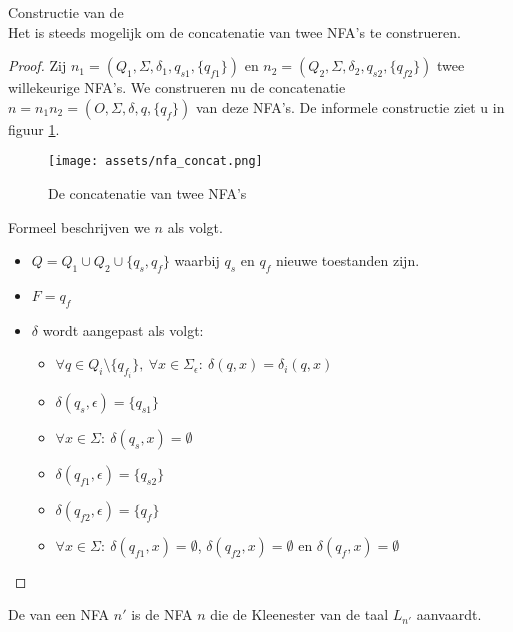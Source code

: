 \documentclass[main.tex]{subfiles}
\begin{document}
\begin{st}
  \label{st:concatenatie-nfas}
  Constructie van de \\
  Het is steeds mogelijk om de concatenatie van twee NFA's te construeren.

  \begin{proof}
    Zij $n_{1} = (Q_{1},\Sigma,\delta_{1},q_{s1},\{q_{f1}\})$ en $n_{2} = (Q_{2},\Sigma,\delta_{2},q_{s2},\{q_{f2}\})$ twee willekeurige NFA's. We construeren nu de concatenatie $n = n_{1}n_{2} = (O,\Sigma,\delta,q,\{q_{f}\})$ van deze NFA's.
    De informele constructie ziet u in figuur \ref{fig:nfa_concat}.
    \begin{figure}[H]
      \centering
      \texttt{[image: assets/nfa\_concat.png]}      
      \caption{De concatenatie van twee NFA's}
      \label{fig:nfa_concat}
    \end{figure}
    Formeel beschrijven we $n$ als volgt.
    \begin{itemize}
    \item $Q = Q_{1} \cup Q_{2} \cup \{ q_{s}, q_{f} \}$ waarbij $q_{s}$ en $q_{f}$ nieuwe toestanden zijn.
    \item $F = {q_{f}}$
    \item $\delta$ wordt aangepast als volgt:
      \begin{itemize}
      \item $\forall q \in Q_{i}\setminus\{q_{f_{i}}\},\ \forall x \in \Sigma_{\epsilon}:\ \delta(q,x) = \delta_{i}(q,x)$
      \item $\delta(q_{s},\epsilon) = \{q_{s1}\}$
      \item $\forall x \in \Sigma:\ \delta(q_{s},x) = \emptyset$
      \item $\delta(q_{f1},\epsilon) = \{q_{s2}\}$
      \item $\delta(q_{f2},\epsilon) = \{q_{f}\}$
      \item $\forall x \in \Sigma:\ \delta(q_{f1},x) = \emptyset$, $\delta(q_{f2},x) = \emptyset$ en $\delta(q_{f},x) = \emptyset$ 
      \end{itemize}
    \end{itemize}
  \end{proof}
\end{st}

\begin{de}
  De  van een NFA $n'$ is de NFA $n$ die de Kleenester van de taal $L_{n'}$ aanvaardt.
\end{de}
\end{document}
